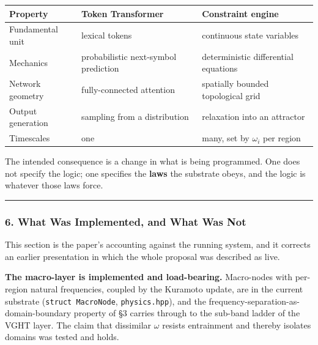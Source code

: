 \documentclass[
  11pt,
  a4paper,
]{article}
\begin{document}
\begin{longtable}[]{@{}
  >{\raggedright\arraybackslash}p{}
  >{\raggedright\arraybackslash}p{}
  >{\raggedright\arraybackslash}p{}@{}}
\toprule\noalign{}
\begin{minipage}[b]{\linewidth}\raggedright
Property
\end{minipage} & \begin{minipage}[b]{\linewidth}\raggedright
Token Transformer
\end{minipage} & \begin{minipage}[b]{\linewidth}\raggedright
Constraint engine
\end{minipage} \\
\midrule\noalign{}
\endhead
\bottomrule\noalign{}
\endlastfoot
Fundamental unit & lexical tokens & continuous state variables \\
Mechanics & probabilistic next-symbol prediction & deterministic
differential equations \\
Network geometry & fully-connected attention & spatially bounded
topological grid \\
Output generation & sampling from a distribution & relaxation into an
attractor \\
Timescales & one & many, set by \(\omega_i\) per region \\
\end{longtable}

The intended consequence is a change in what is being programmed. One
does not specify the logic; one specifies the \textbf{laws} the
substrate obeys, and the logic is whatever those laws force.

\begin{center}\rule{0.5\linewidth}{0.5pt}\end{center}

\subsubsection{6. What Was Implemented, and What Was
Not}\label{what-was-implemented-and-what-was-not}

This section is the paper's accounting against the running system, and
it corrects an earlier presentation in which the whole proposal was
described as live.

\textbf{The macro-layer is implemented and load-bearing.} Macro-nodes
with per-region natural frequencies, coupled by the Kuramoto update, are
in the current substrate (\texttt{struct\ MacroNode},
\texttt{physics.hpp}), and the frequency-separation-as-domain-boundary
property of §3 carries through to the sub-band ladder of the VGHT layer.
The claim that dissimilar \(\omega\) resists entrainment and thereby
isolates domains was tested and holds.
\end{document}
